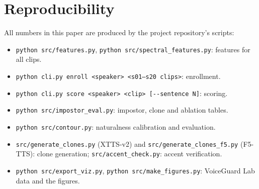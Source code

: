 \documentclass[11pt,a4paper]{article}
\begin{document}
\clearpage
\appendix
\section{Reproducibility}
All numbers in this paper are produced by the project repository's scripts:
\begin{itemize}
\item \texttt{python src/features.py}, \texttt{python src/spectral\_features.py}: features for all clips.
\item \texttt{python cli.py enroll <speaker> <s01--s20 clips>}: enrollment.
\item \texttt{python cli.py score <speaker> <clip> [-{}-sentence N]}: scoring.
\item \texttt{python src/impostor\_eval.py}: impostor, clone and ablation tables.
\item \texttt{python src/contour.py}: naturalness calibration and evaluation.
\item \texttt{src/generate\_clones.py} (XTTS-v2) and \texttt{src/generate\_clones\_f5.py} (F5-TTS): clone generation; \texttt{src/accent\_check.py}: accent verification.
\item \texttt{python src/export\_viz.py}, \texttt{python src/make\_figures.py}: VoiceGuard Lab data and the figures.
\end{itemize}
\end{document}
